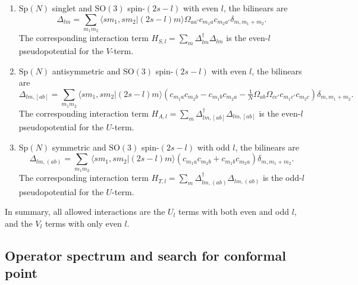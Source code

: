 \documentclass{timesjhep}
\begin{document}
\begin{enumerate}
    \item $\mathrm{Sp}(N)$ singlet and $\mathrm{SO}(3)$ spin-$(2s-l)$ with even $l$, the bilinears are 
    \begin{equation}
        \Delta_{lm}=\sum_{m_1m_2}\langle sm_1,sm_2|(2s-l)m\rangle\Omega_{aa'}c_{m_1a}c_{m_2a'}\delta_{m,m_1+m_2}.
    \end{equation} 
    The corresponding interaction term $H_{S,l}=\sum_m\Delta_{lm}^\dagger\Delta_{lm}$ is the even-$l$ pseudopotential for the $V$-term. 
    \item $\mathrm{Sp}(N)$ antisymmetric and $\mathrm{SO}(3)$ spin-$(2s-l)$ with even $l$, the bilinears are 
    \begin{equation}
        \Delta_{lm,[ab]}=\sum_{m_1m_2}\langle sm_1,sm_2|(2s-l)m\rangle\left(c_{m_1a}c_{m_2b}-c_{m_1b}c_{m_2a}-\tfrac{1}{N}\Omega_{ab}\Omega_{cc'}c_{m_1c'}c_{m_2c}\right)\delta_{m,m_1+m_2}.
    \end{equation} 
    The corresponding interaction term $H_{A,l}=\sum_m\Delta_{lm,[ab]}^\dagger\Delta_{lm,[ab]}$ is the even-$l$ pseudopotential for the $U$-term. 
    \item $\mathrm{Sp}(N)$ symmetric and $\mathrm{SO}(3)$ spin-$(2s-l)$ with odd $l$, the bilinears are 
    \begin{equation}
        \Delta_{lm,(ab)}=\sum_{m_1m_2}\langle sm_1,sm_2|(2s-l)m\rangle\left(c_{m_1a}c_{m_2b}+c_{m_1b}c_{m_2a}\right)\delta_{m,m_1+m_2}.
    \end{equation} 
    The corresponding interaction term $H_{T,l}=\sum_m\Delta_{lm,(ab)}^\dagger\Delta_{lm,(ab)}$ is the odd-$l$ pseudopotential for the $U$-term. 
\end{enumerate}

In summary, all allowed interactions are the $U_l$ terms with both even and odd $l$, and the $V_l$ terms with only even $l$. 

\subsection{Operator spectrum and search for conformal point}
\label{sec:construct_spec}
\end{document}
